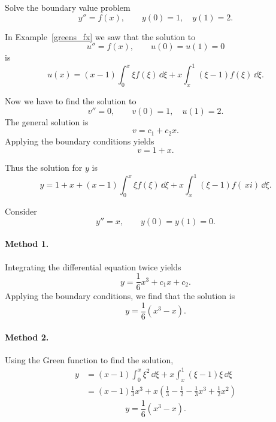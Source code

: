 













\begin{Example}
  Solve the boundary value problem
  \[ 
  y'' = f(x), \qquad y(0) = 1, \quad y(1) = 2.
  \]

  In Example~\ref{greens_fx} we saw that the solution to
  \[ 
  u'' = f(x), \qquad u(0) = u(1) = 0 
  \]
  is
  \[ 
  u(x) = (x-1) \int_0^x \xi f(\xi)\,\dd \xi + x \int_x^1 (\xi - 1) f(\xi)\,\dd \xi.
  \]

  Now we have to find the solution to
  \[ 
  v'' = 0, \qquad v(0) = 1, \quad u(1) = 2.
  \]
  The general solution is
  \[ 
  v = c_1 + c_2 x.
  \]
  Applying the boundary conditions yields
  \[ 
  v = 1 + x.
  \]

  Thus the solution for $y$ is
  \[ 
  \boxed{
    y = 1 + x + (x-1) \int_0^x \xi f(\xi)\,\dd \xi 
    + x \int_x^1 (\xi - 1) f(\ xi)\,\dd \xi.
    }
  \]
\end{Example}

















\begin{Example}
  Consider
  \[ 
  y'' = x, \qquad y(0) = y(1) = 0. 
  \]

  \paragraph{Method 1.}
  Integrating the differential equation twice yields
  \[ 
  y = \frac{1}{6} x^3 + c_1 x + c_2. 
  \]
  Applying the boundary conditions, we find that the solution is
  \[ 
  \boxed{ 
    y = \frac{1}{6} (x^3 - x). 
    } 
  \]

  \paragraph{Method 2.}
  Using the Green function to find the solution,
  \begin{align*}
    y       &= (x-1) \int_0^x \xi^2 \,\dd \xi + x \int_x^1 (\xi-1)\xi\,\dd \xi \\
    &= (x-1) \frac{1}{3} x^3 + x \left( \frac{1}{3} - \frac{1}{2}
      -\frac{1}{3} x^3 + \frac{1}{2} x^2 \right)
  \end{align*}
  \[ 
  \boxed{ 
    y = \frac{1}{6} (x^3 - x). 
    } 
  \]
\end{Example}














